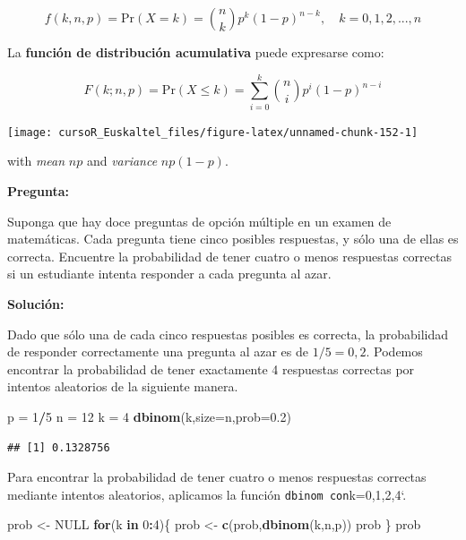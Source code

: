 \documentclass[]{book}
\newenvironment{Shaded}{\begin{snugshade}}{\end{snugshade}}
\newcommand{\KeywordTok}[1]{\textcolor[rgb]{0.13,0.29,0.53}{\textbf{#1}}}
\newcommand{\DataTypeTok}[1]{\textcolor[rgb]{0.13,0.29,0.53}{#1}}
\newcommand{\DecValTok}[1]{\textcolor[rgb]{0.00,0.00,0.81}{#1}}
\newcommand{\FloatTok}[1]{\textcolor[rgb]{0.00,0.00,0.81}{#1}}
\newcommand{\StringTok}[1]{\textcolor[rgb]{0.31,0.60,0.02}{#1}}
\newcommand{\OtherTok}[1]{\textcolor[rgb]{0.56,0.35,0.01}{#1}}
\newcommand{\ControlFlowTok}[1]{\textcolor[rgb]{0.13,0.29,0.53}{\textbf{#1}}}
\newcommand{\OperatorTok}[1]{\textcolor[rgb]{0.81,0.36,0.00}{\textbf{#1}}}
\newcommand{\NormalTok}[1]{#1}
\begin{document}
\[
{
f(k,n,p) = \mbox{Pr}(X=k)=\binom{n}{k} p^k (1-p)^{n-k}, \quad k=0,1,2,...,n
}
\]

La \textbf{función de distribución acumulativa} puede expresarse como:

\[
{
F(k;n,p) = \mbox{Pr}(X\leq k) = \sum_{i=0}^{k}\binom{n}{i} p^i (1-p)^{n-i}
}
\]

\begin{center}\texttt{[image: cursoR\_Euskaltel\_files/figure-latex/unnamed-chunk-152-1]} \end{center}

with \emph{mean} \(np\) and \emph{variance} \(np(1-p)\).

\textbf{Pregunta:}

Suponga que hay doce preguntas de opción múltiple en un examen de
matemáticas. Cada pregunta tiene cinco posibles respuestas, y sólo una
de ellas es correcta. Encuentre la probabilidad de tener cuatro o menos
respuestas correctas si un estudiante intenta responder a cada pregunta
al azar.

\textbf{Solución:}

Dado que sólo una de cada cinco respuestas posibles es correcta, la
probabilidad de responder correctamente una pregunta al azar es de
\(1/5=0,2\). Podemos encontrar la probabilidad de tener exactamente 4
respuestas correctas por intentos aleatorios de la siguiente manera.

\begin{Shaded}
\begin{Highlighting}[]
\NormalTok{p =}\StringTok{ }\DecValTok{1}\OperatorTok{/}\DecValTok{5}
\NormalTok{n =}\StringTok{ }\DecValTok{12}
\NormalTok{k =}\StringTok{ }\DecValTok{4}
\KeywordTok{dbinom}\NormalTok{(k,}\DataTypeTok{size=}\NormalTok{n,}\DataTypeTok{prob=}\FloatTok{0.2}\NormalTok{)}
\end{Highlighting}
\end{Shaded}

\begin{verbatim}
## [1] 0.1328756
\end{verbatim}

Para encontrar la probabilidad de tener cuatro o menos respuestas
correctas mediante intentos aleatorios, aplicamos la función
\texttt{dbinom\textquotesingle{}\ con}k=0,1,2,4`.

\begin{Shaded}
\begin{Highlighting}[]
\NormalTok{prob <-}\StringTok{ }\OtherTok{NULL}
\ControlFlowTok{for}\NormalTok{(k }\ControlFlowTok{in} \DecValTok{0}\OperatorTok{:}\DecValTok{4}\NormalTok{)\{}
\NormalTok{prob <-}\StringTok{ }\KeywordTok{c}\NormalTok{(prob,}\KeywordTok{dbinom}\NormalTok{(k,n,p))}
\NormalTok{prob}
\NormalTok{\}}
\NormalTok{prob}
\end{Highlighting}
\end{Shaded}
\end{document}
